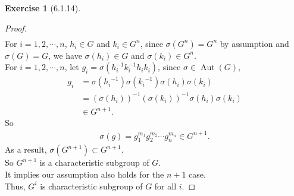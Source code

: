\documentclass{amsart}
\theoremstyle{plain}
\theoremstyle{definition}
\newtheorem{exer}[lem]{Exercise}
\begin{document}
\begin{exer}[6.1.14]
\begin{proof}
\begin{align*}
  	\end{align*}
  	For $i = 1,2,\cdots,n$, $h_i \in G$ and $k_i \in G^n$, since $\sigma(G^n) = G^n$ by assumption and $\sigma(G) = G$, we have $\sigma(h_i) \in G$ and $\sigma(k_i)\in G^n$.\\
  	For $i = 1,2,\cdots,n$, let $g_i = \sigma\left(h_i^{-1}k_i^{-1}h_ik_i\right)$, since $\sigma \in \operatorname{Aut}(G)$,
  	\begin{align*}
  		g_i &= \sigma({h_i}^{-1})\sigma({k_i}^{-1}) \sigma(h_i) \sigma(k_i) \\
  			&= \left(\sigma(h_i)\right)^{-1}\left(\sigma(k_i)\right)^{-1}\sigma(h_i)\sigma(k_i) \\
  	  	    &\in G^{n+1}.
    \end{align*}
    So
    \begin{align*}
		\sigma(g) = g_1^{m_1}g_2^{m_2}\cdots g_n^{m_n} \in G^{n+1}. 
    \end{align*}
    As a result, $\sigma(G^{n+1}) \subset  G^{n+1}$.\\
    So $G^{n+1}$ is a characteristic subgroup of $G$.\\
	It implies our assumption also holds for the $n+1$ case.\\
	Thus, $G^i$ is characteristic subgroup of $G$ for all $i$.
\end{proof}
\end{exer}
\end{document}
